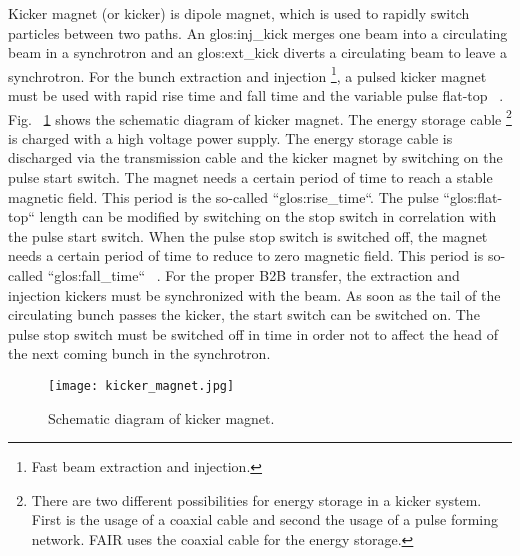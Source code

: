 Kicker magnet (or kicker) is dipole magnet, which is used to rapidly switch particles between two paths. An \gls{glos:inj_kick} merges one beam into a circulating beam in a synchrotron and an \gls{glos:ext_kick} diverts a circulating beam to leave a synchrotron. For the bunch extraction and injection \footnote{Fast beam extraction and injection.}, a pulsed kicker magnet must be used with rapid rise time and fall time and the variable pulse flat-top ~\cite{wang_design_1991, petzenhauser_concept_2016}. Fig. ~\ref{kicker_magnet} shows the schematic diagram of kicker magnet. The energy storage cable \footnote{There are two different possibilities for energy storage in a kicker system. First is the usage of a coaxial cable and second the usage of a pulse forming network. FAIR uses the coaxial cable for the energy storage.} is charged with a high voltage power supply. The energy storage cable is discharged via the transmission cable and the kicker magnet by switching on the pulse start switch. The magnet needs a certain period of time to reach a stable magnetic field. This period is the so-called ``\gls{glos:rise_time}``. The pulse ``\gls{glos:flat-top}`` length can be modified by switching on the stop switch in correlation with the pulse start switch. When the pulse stop switch is switched off, the magnet needs a certain period of time to reduce to zero magnetic field. This period is so-called ``\gls{glos:fall_time}`` ~\cite{udo_injection_2014}. For the proper B2B transfer, the extraction and injection kickers must be synchronized with the beam. As soon as the tail of the circulating bunch passes the kicker, the start switch can be switched on. The pulse stop switch must be switched off in time in order not to affect the head of the next coming bunch in the synchrotron.
\begin{figure}[!htb]
   \centering   
   \texttt{[image: kicker\_magnet.jpg]}
   \caption{Schematic diagram of kicker magnet.}
   \label{kicker_magnet}
\end{figure}
 
%		  
%


